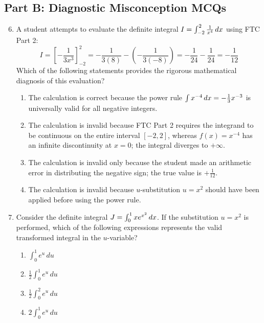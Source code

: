 \subsection*{Part B: Diagnostic Misconception MCQs}

\begin{enumerate}
    \setcounter{enumi}{5}
    \item A student attempts to evaluate the definite integral $I = \int_{-2}^2 \frac{1}{x^4} \,dx$ using FTC Part 2:
    \begin{equation}
    I = \left[ -\frac{1}{3x^3} \right]_{-2}^2 = -\frac{1}{3(8)} - \left( -\frac{1}{3(-8)} \right) = -\frac{1}{24} - \frac{1}{24} = -\frac{1}{12}
    \end{equation}
    Which of the following statements provides the rigorous mathematical diagnosis of this evaluation?
    \begin{enumerate}
        \item The calculation is correct because the power rule $\int x^{-4} \,dx = -\frac{1}{3}x^{-3}$ is universally valid for all negative integers.
        \item The calculation is invalid because FTC Part 2 requires the integrand to be continuous on the entire interval $[-2, 2]$, whereas $f(x) = x^{-4}$ has an infinite discontinuity at $x = 0$; the integral diverges to $+\infty$.
        \item The calculation is invalid only because the student made an arithmetic error in distributing the negative sign; the true value is $+\frac{1}{12}$.
        \item The calculation is invalid because $u$-substitution $u = x^2$ should have been applied before using the power rule.
    \end{enumerate}

    \item Consider the definite integral $J = \int_0^1 x e^{x^2} \,dx$. If the substitution $u = x^2$ is performed, which of the following expressions represents the valid transformed integral in the $u$-variable?
    \begin{enumerate}
        \item $\int_0^1 e^u \, du$
        \item $\frac{1}{2} \int_0^1 e^u \, du$
        \item $\frac{1}{2} \int_0^2 e^u \, du$
        \item $2 \int_0^1 e^u \, du$
    \end{enumerate}
\end{enumerate}
